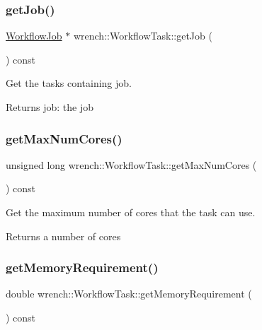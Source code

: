 \subsubsection{\texorpdfstring{get\+Job()}{getJob()}}
{\footnotesize\ttfamily \hyperlink{classwrench_1_1_workflow_job}{Workflow\+Job} $\ast$ wrench\+::\+Workflow\+Task\+::get\+Job (\begin{DoxyParamCaption}{ }\end{DoxyParamCaption}) const}



Get the task\textquotesingle{}s containing job. 

\begin{DoxyReturn}{Returns}
job\+: the job 
\end{DoxyReturn}
\mbox{\label{classwrench_1_1_workflow_task_aa470fe4c0a34211165989afabcba795f}} 
\subsubsection{\texorpdfstring{get\+Max\+Num\+Cores()}{getMaxNumCores()}}
{\footnotesize\ttfamily unsigned long wrench\+::\+Workflow\+Task\+::get\+Max\+Num\+Cores (\begin{DoxyParamCaption}{ }\end{DoxyParamCaption}) const}



Get the maximum number of cores that the task can use. 

\begin{DoxyReturn}{Returns}
a number of cores 
\end{DoxyReturn}
\mbox{\label{classwrench_1_1_workflow_task_aeafc6e6f0bce5853a3fd1e4818638908}} 
\subsubsection{\texorpdfstring{get\+Memory\+Requirement()}{getMemoryRequirement()}}
{\footnotesize\ttfamily double wrench\+::\+Workflow\+Task\+::get\+Memory\+Requirement (\begin{DoxyParamCaption}{ }\end{DoxyParamCaption}) const}



